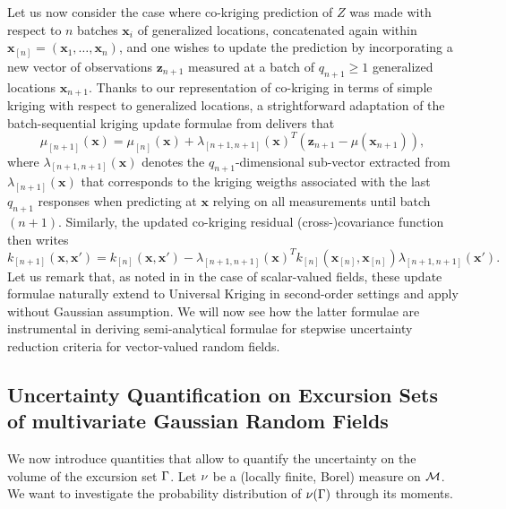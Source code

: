 \documentclass[aoas]{imsart}
\begin{document}
Let us now consider the case where co-kriging prediction of $Z$ was made with respect to $n$ batches $\bm{x}_i$ of generalized locations, concatenated again within
$\bm{x}_{[n]}=(\bm{x}_1,\dots, \bm{x}_n)$, and one wishes to update the prediction by incorporating a new vector of observations $\mathbf{z}_{n+1}$ measured at a batch of $q_{n+1} \geq 1$ generalized locations $\bm{x}_{n+1}$.
Thanks to our representation of co-kriging in terms of simple kriging with respect to generalized locations, a strightforward adaptation of the batch-sequential kriging update formulae from \cite{Chevalier.etal2013a} delivers that
% 
\begin{equation}
\mu_{[n+1]}(\bm{x})=\mu_{[n]}(\bm{x})+\lambda_{[n+1,n+1]}(\bm{x})^T (\mathbf{z}_{n+1}-\mu(\bm{x}_{n+1})),
\end{equation}
where $\lambda_{[n+1,n+1]}(\bm{x})$ denotes the $q_{n+1}$-dimensional sub-vector extracted from
$\lambda_{[n+1]}(\bm{x})$ that corresponds to the kriging weigths associated with the last $q_{n+1}$ responses when 
predicting at $\bm{x}$ relying on all measurements until batch $(n+1)$.
Similarly, the updated co-kriging residual (cross-)covariance function then writes
\begin{equation}
k_{[n+1]}(\bm{x},\bm{x}')=k_{[n]}(\bm{x},\bm{x}')-\lambda_{[n+1,n+1]}(\bm{x})^T k_{[n]}(\bm{x}_{[n]}, \bm{x}_{[n]}) \lambda_{{[n+1,n+1]}}(\bm{x}').
\end{equation}
%
Let us remark that, as noted in \cite{Chevalier2015} in the case of scalar-valued fields, these update formulae naturally 
extend to Universal Kriging in second-order settings and apply without Gaussian assumption. We will now see how the latter formulae are instrumental in deriving semi-analytical formulae for stepwise uncertainty reduction criteria for 
vector-valued random fields.






\subsection{Uncertainty Quantification on Excursion Sets of multivariate Gaussian Random Fields}
\label{sec:set_uq}
We now introduce quantities that allow to quantify the uncertainty on the volume of the excursion set $\Gamma$. Let $\nu$ be a 
(locally finite, Borel) measure  on $\mathcal{M}$. We want to investigate the probability distribution 
of $\nu(\Gamma)$ through its moments.
\end{document}
